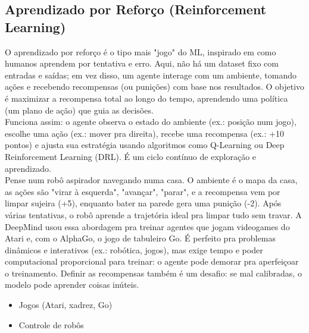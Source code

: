 \documentclass[a4paper,12pt,openany]{book}
\begin{document}
\subsection{Aprendizado por Reforço (Reinforcement Learning)}
O aprendizado por reforço é o tipo mais "jogo" do ML, inspirado em como humanos aprendem por tentativa e erro. Aqui, não há um dataset fixo com entradas e saídas; em vez disso, um agente interage com um ambiente, tomando ações e recebendo recompensas (ou punições) com base nos resultados. O objetivo é maximizar a recompensa total ao longo do tempo, aprendendo uma política (um plano de ação) que guia as decisões.\\
Funciona assim: o agente observa o estado do ambiente (ex.: posição num jogo), escolhe uma ação (ex.: mover pra direita), recebe uma recompensa (ex.: +10 pontos) e ajusta sua estratégia usando algoritmos como Q-Learning ou Deep Reinforcement Learning (DRL). É um ciclo contínuo de exploração e aprendizado. \\
Pense num robô aspirador navegando numa casa. O ambiente é o mapa da casa, as ações são "virar à esquerda", "avançar", "parar", e a recompensa vem por limpar sujeira (+5), enquanto bater na parede gera uma punição (-2). Após várias tentativas, o robô aprende a trajetória ideal pra limpar tudo sem travar. A DeepMind usou essa abordagem pra treinar agentes que jogam videogames do Atari e, com o AlphaGo, o jogo de tabuleiro Go.
É perfeito pra problemas dinâmicos e interativos (ex.: robótica, jogos), mas exige tempo e poder computacional proporcional para treinar: o agente pode demorar pra aperfeiçoar o treinamento. Definir as recompensas também é um desafio: se mal calibradas, o modelo pode aprender coisas inúteis.
\begin{itemize}
    \item Jogos (Atari, xadrez, Go)
    \item Controle de robôs
\end{itemize}
\end{document}
